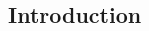 \documentclass{article}
\newlength{\abstractwidth}
\newlength{\columnshrink}
\begin{document}
\begin{multicols}{3}
  \setlength{\abstractwidth}{2\linewidth}
  \addtolength{\abstractwidth}{\columnsep}
  \setlength{\columnshrink}{\ht\twocolinsert}
  \addtolength{\columnshrink}{\dp\twocolinsert}
  \noindent\usebox{\twocolinsert}

  \section*{Introduction}
  \lipsum[2-10]
  \end{multicols}
\end{document}
